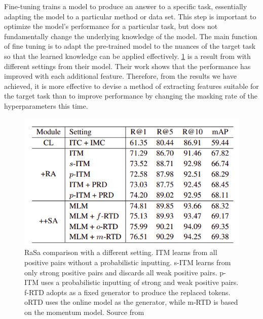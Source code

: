 Fine-tuning trains a model to produce an answer to a specific task, essentially adapting the model to a particular method or data set. This step is important to optimize the model's performance for a particular task, but does not fundamentally change the underlying knowledge of the model. The main function of fine tuning is to adapt the pre-trained model to the nuances of the target task so that the learned knowledge can be applied effectively. \ref{fig:rasa_comparison} is a result from \cite{Bai2023RaSaRA} with different settings from their model. Their work shows that the performance has improved with each additional feature. Therefore, from the results we have achieved, it is more effective to devise a method of extracting features suitable for the target task than to improve performance by changing the masking rate of the hyperparameters this time.

\begin{figure}[htbp]
  \includegraphics[width=\linewidth]{img/rasa_comparison.png}
  \caption{RaSa comparison with a different setting. ITM learns from all positive pairs without a probabilistic inputting. s-ITM learns from only strong positive pairs and discards all weak positive pairs. p-ITM uses a probabilistic inputting of strong and weak positive pairs. f-RTD adopts \cite{sanh2020distilbertdistilledversionbert} as a fixed generator to produce the replaced tokens. oRTD uses the online model as the generator, while m-RTD is based on the momentum model. Source from \cite{Bai2023RaSaRA}}
  \label{fig:rasa_comparison}
\end{figure}


